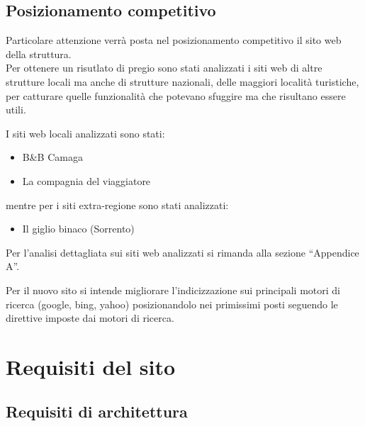 \documentclass[a4paper,12pt,hidelinks]{report}
\begin{document}
\section{Posizionamento competitivo}
  Particolare attenzione verrà posta nel posizionamento competitivo il sito web della struttura.
  \\Per ottenere un risutlato di pregio sono stati analizzati i siti web di altre strutture locali ma anche di strutture nazionali, delle maggiori località turistiche, 
  per catturare quelle funzionalità che potevano sfuggire ma che risultano essere utili.
  \par I siti web locali analizzati sono stati:
  \begin{itemize}
    \item B\&B Camaga
    \item La compagnia del viaggiatore
  \end{itemize}
  mentre per i siti extra-regione sono stati analizzati:
  \begin{itemize}
    \item Il giglio binaco (Sorrento)
  \end{itemize}
  Per l'analisi dettagliata sui siti web analizzati si rimanda alla sezione ``Appendice A''.
  \par Per il nuovo sito si intende migliorare l'indicizzazione sui principali motori di ricerca (google, bing, yahoo) posizionandolo nei primissimi posti 
  seguendo le direttive imposte dai motori di ricerca.

\chapter{Requisiti del sito}

\section{Requisiti di architettura}
\end{document}
